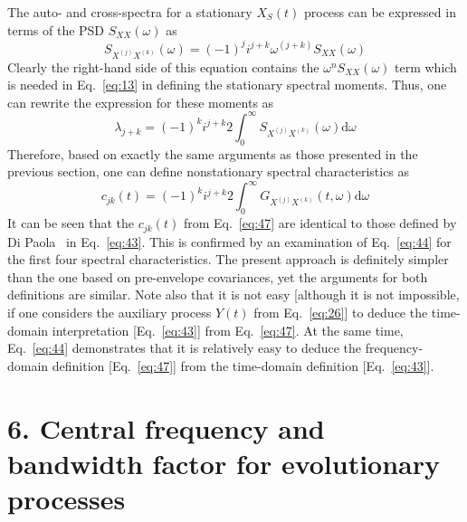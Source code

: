 \documentclass{article}
\begin{document}
The auto- and cross-spectra for a stationary $X_S (t)$ process can be
expressed in terms of the PSD $S_{XX} (\omega)$ as
\begin{equation}
  S_{X^{(j)} X^{(k)}} (\omega) = (- 1)^j i^{j + k} \omega^{(j + k)} S_{XX}
  (\omega) \label{eq:45}
\end{equation}
Clearly the right-hand side of this equation contains the $\omega^n S_{XX}
(\omega)$ term which is needed in Eq.~\eqref{eq:13} in defining the stationary
spectral moments. Thus, one can rewrite the expression for these moments as
\begin{equation}
  \lambda_{j + k} = (- 1)^k i^{j + k} 2 \int_0^{\infty} S_{X^{(j)} X^{(k)}}
  (\omega) \mathrm{d} \omega \label{eq:46}
\end{equation}
Therefore, based on exactly the same arguments as those presented in the
previous section, one can define nonstationary spectral characteristics as
\begin{equation}
  c_{jk} (t) = (- 1)^k i^{j + k} 2 \int_0^{\infty} G_{X^{(j)} X^{(k)}} (t,
  \omega) \mathrm{d} \omega \label{eq:47}
\end{equation}
It can be seen that the $c_{jk} (t)$ from Eq.~\eqref{eq:47} are identical to
those defined by Di Paola~{\cite{DiPaola1985}} in Eq.~\eqref{eq:43}. This is
confirmed by an examination of Eq.~\eqref{eq:44} for the first four spectral
characteristics. The present approach is definitely simpler than the one based
on pre-envelope covariances, yet the arguments for both definitions are
similar. Note also that it is not easy [although it is not impossible, if one
considers the auxiliary process $Y (t)$ from Eq.~\eqref{eq:26}] to deduce the
time-domain interpretation [Eq.~\eqref{eq:43}] from Eq.~\eqref{eq:47}. At the
same time, Eq.~\eqref{eq:44} demonstrates that it is relatively easy to deduce
the frequency-domain definition [Eq.~\eqref{eq:47}] from the time-domain
definition [Eq.~\eqref{eq:43}].

\section*{6. Central frequency and bandwidth factor for evolutionary
processes}
\end{document}
